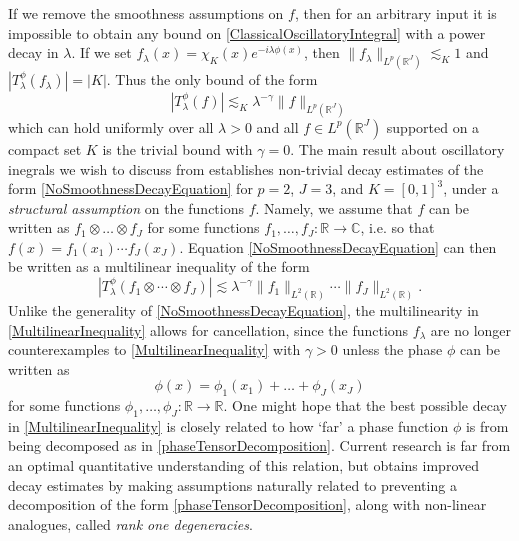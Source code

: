 \documentclass[12pt]{amsart}
\def\C{\mathbb{C}}
\newcommand*{\R}{\mathbb{R}}
\begin{document}
If we remove the smoothness assumptions on $f$, then for an arbitrary input it is impossible to obtain any bound on \eqref{ClassicalOscillatoryIntegral} with a power decay in $\lambda$. If we set
$f_\lambda(x) = \chi_K(x) e^{-i \lambda \phi(x)}$, then $\| f_\lambda \|_{L^p(\R^J)} \lesssim_K 1$ and $|T^\phi_\lambda(f_\lambda)| = |K|$. Thus the only bound of the form
%
\begin{equation} \label{NoSmoothnessDecayEquation}
	| T^\phi_\lambda(f)| \lesssim_K \lambda^{-\gamma} \| f \|_{L^p(\R^J)}
\end{equation}
%
which can hold uniformly over all $\lambda > 0$ and all $f \in L^p(\R^J)$ supported on a compact set $K$ is the trivial bound with $\gamma = 0$. The main result about oscillatory inegrals we wish to discuss from \cite{ChristTopicPaper} establishes non-trivial decay estimates of the form \eqref{NoSmoothnessDecayEquation} for $p = 2$, $J = 3$, and $K = [0,1]^3$, under a \emph{structural assumption} on the functions $f$. Namely, we assume that $f$ can be written as $f_1 \otimes \dots \otimes f_J$ for some functions $f_1,\dots,f_J: \R \to \C$, i.e. so that $f(x) = f_1(x_1) \cdots f_J(x_J)$. Equation \eqref{NoSmoothnessDecayEquation} can then be written as a multilinear inequality of the form
%
\begin{equation} \label{MultilinearInequality}
	| T^\phi_\lambda(f_1 \otimes \cdots \otimes f_J) | \lesssim \lambda^{-\gamma} \| f_1 \|_{L^2(\R)} \cdots \| f_J \|_{L^2(\R)}.
\end{equation}
%
Unlike the generality of \eqref{NoSmoothnessDecayEquation}, the multilinearity in \eqref{MultilinearInequality} allows for cancellation, since the functions $f_\lambda$ are no longer counterexamples to \eqref{MultilinearInequality} with $\gamma > 0$ unless the phase $\phi$ can be written as
%
\begin{equation} \label{phaseTensorDecomposition}
	\phi(x) = \phi_1(x_1) + \dots + \phi_J(x_J)
\end{equation}
%
for some functions $\phi_1,\dots,\phi_J: \R \to \R$. One might hope that the best possible decay in \eqref{MultilinearInequality} is closely related to how `far' a phase function $\phi$ is from being decomposed as in \eqref{phaseTensorDecomposition}. Current research is far from an optimal quantitative understanding of this relation, but \cite{ChristTopicPaper} obtains improved decay estimates by making assumptions naturally related to preventing a decomposition of the form \eqref{phaseTensorDecomposition}, along with non-linear analogues, called \emph{rank one degeneracies}.
\end{document}
